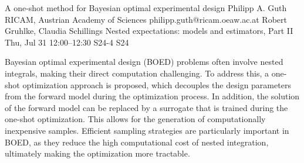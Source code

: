 \begin{talk}
  {A one-shot method for Bayesian optimal experimental design}%
  {Philipp A. Guth}%
  {RICAM, Austrian Academy of Sciences}%
  {philipp.guth@ricam.oeaw.ac.at}%
  {Robert Gruhlke, Claudia Schillings}%
  {Nested expectations: models and estimators, Part II}%
  {Thu, Jul 31 12:00–12:30}%
  {S24-4}%
  {S24}%
				
		
Bayesian optimal experimental design (BOED) problems often involve nested integrals, making their direct computation challenging. To address this, a one-shot optimization approach is proposed, which decouples the design parameters from the forward model during the optimization process. In addition, the solution of the forward model can be replaced by a surrogate that is trained during the one-shot optimization. This allows for the generation of computationally inexpensive samples. Efficient sampling strategies are particularly important in BOED, as they reduce the high computational cost of nested integration, ultimately making the optimization more tractable.



%
%
\end{talk}

